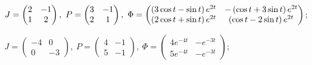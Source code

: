 \begin{enumsolsfull}
		\item \( J = \begin{pmatrix} 2 & -1 \\ 1 & 2 \end{pmatrix}, ~ P = \begin{pmatrix} 3 & -1 \\ 2 & 1 \end{pmatrix}, ~ \Phi = \begin{pmatrix} \left( 3\cos{t} - \sin{t} \right) e^{2t} & -\left( \cos{t} + 3\sin{t} \right) e^{2t} \\ \left( 2 \cos{t} + \sin{t} \right) e^{2t} & \left( \cos{t} - 2\sin{t} \right) e^{2t} \end{pmatrix} \); %
		\item \( J = \begin{pmatrix} -4 & 0 \\ 0 & -3 \end{pmatrix}, ~ P = \begin{pmatrix} 4 & -1 \\ 5 & -1 \end{pmatrix}, ~ \Phi = \begin{pmatrix} 4e^{-4t} & -e^{-3t} \\ 5e^{-4t} & -e^{-3t} \end{pmatrix} \); %

\end{enumsolsfull}
